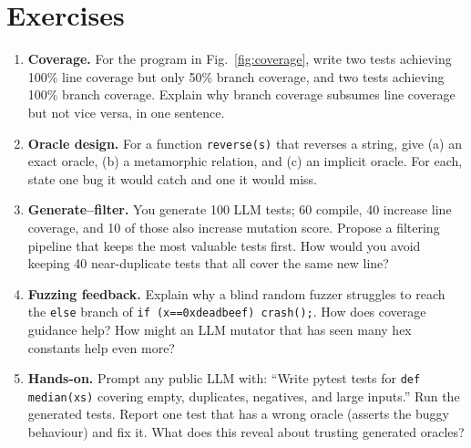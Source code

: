 \section{Exercises}
\label{sec:ch03-exercises}
\begin{enumerate}[label=E3.\arabic*, leftmargin=*, itemsep=0.7em]
    \item \textbf{Coverage.} For the program in Fig.~\ref{fig:coverage}, write two tests achieving 100\% line coverage but only 50\% branch coverage, and two tests achieving 100\% branch coverage. Explain why branch coverage subsumes line coverage but not vice versa, in one sentence.
    \item \textbf{Oracle design.} For a function \texttt{reverse(s)} that reverses a string, give (a) an exact oracle, (b) a metamorphic relation, and (c) an implicit oracle. For each, state one bug it would catch and one it would miss.
    \item \textbf{Generate--filter.} You generate 100 LLM tests; 60 compile, 40 increase line coverage, and 10 of those also increase mutation score. Propose a filtering pipeline that keeps the most valuable tests first. How would you avoid keeping 40 near-duplicate tests that all cover the same new line?
    \item \textbf{Fuzzing feedback.} Explain why a blind random fuzzer struggles to reach the \texttt{else} branch of \texttt{if (x==0xdeadbeef) crash();}. How does coverage guidance help? How might an LLM mutator that has seen many hex constants help even more?
    \item \textbf{Hands-on.} Prompt any public LLM with: ``Write pytest tests for \texttt{def median(xs)} covering empty, duplicates, negatives, and large inputs.'' Run the generated tests. Report one test that has a wrong oracle (asserts the buggy behaviour) and fix it. What does this reveal about trusting generated oracles?
\end{enumerate}
